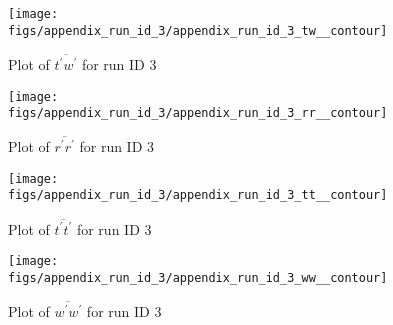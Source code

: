 \begin{figure}[H]
\centering
\texttt{[image: figs/appendix\_run\_id\_3/appendix\_run\_id\_3\_tw\_\_contour]}
\caption{Plot of $\overline{t^\prime w^\prime}$ for run ID 3}
\label{fig:appendix_run_id_3_tw__contour}
\end{figure}


\begin{figure}[H]
\centering
\texttt{[image: figs/appendix\_run\_id\_3/appendix\_run\_id\_3\_rr\_\_contour]}
\caption{Plot of $\overline{r^\prime r^\prime}$ for run ID 3}
\label{fig:appendix_run_id_3_rr__contour}
\end{figure}


\begin{figure}[H]
\centering
\texttt{[image: figs/appendix\_run\_id\_3/appendix\_run\_id\_3\_tt\_\_contour]}
\caption{Plot of $\overline{t^\prime t^\prime}$ for run ID 3}
\label{fig:appendix_run_id_3_tt__contour}
\end{figure}


\begin{figure}[H]
\centering
\texttt{[image: figs/appendix\_run\_id\_3/appendix\_run\_id\_3\_ww\_\_contour]}
\caption{Plot of $\overline{w^\prime w^\prime}$ for run ID 3}
\label{fig:appendix_run_id_3_ww__contour}
\end{figure}


